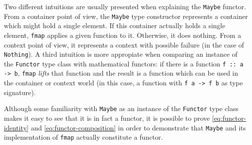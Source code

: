 \begin{example}
Two different intuitions are usually presented when explaining the
\texttt{Maybe} functor. From a container point of view, the
\texttt{Maybe} type constructor represents a container which might
hold a single element. If this container actually holds a single
element, \texttt{fmap} applies a given function to it. Otherwise, it
does nothing. From a context point of view, it represents a context
with possible failure (in the case of \texttt{Nothing}). A third
intuition is more appropiate when comparing an instance of the
\texttt{Functor} type class with mathematical functors: if there is a
function \texttt{f :: a -> b}, \texttt{fmap} \emph{lifts} that
function and the result is a function which can be used in the
container or context world (in this case, a function with \texttt{f a
  -> f b} as type signature).

Although some familiarity with \texttt{Maybe} as an instance of the
\texttt{Functor} type class makes it easy to see that it is in fact a
functor, it is possible to prove \eqref{eq:functor-identity} and
\eqref{eq:functor-composition} in order to demonstrate that \texttt{Maybe} and
its implementation of \texttt{fmap} actually constitute a functor.


\end{example}
